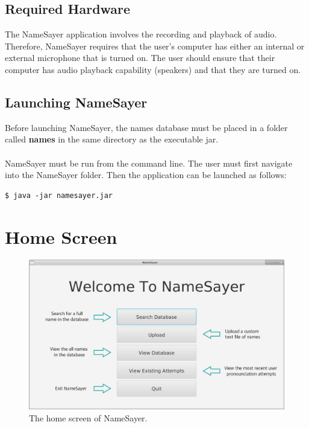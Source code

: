 \documentclass{article}
\begin{document}
\subsection{Required Hardware}
The NameSayer application involves the recording and playback of audio.
Therefore, NameSayer requires that the user's computer has either an internal or
external microphone that is turned on. The user should ensure that their
computer has audio playback capability (speakers) and that they are turned on.

\subsection{Launching NameSayer}
Before launching NameSayer, the names database must be placed in a folder called
\textbf{names} in the same directory as  the executable jar. \\

 \ \\

NameSayer must be run from the command line. The user must first navigate into
the NameSayer folder. Then the application can be launched as follows:

\begin{verbatim}
$ java -jar namesayer.jar
\end{verbatim}

\section{Home Screen}

\begin{figure}[H]
	\includegraphics[width=\textwidth]{images/1_home.jpg}
	\caption{The home screen of NameSayer.}
	\label{home}
\end{figure}
\end{document}
